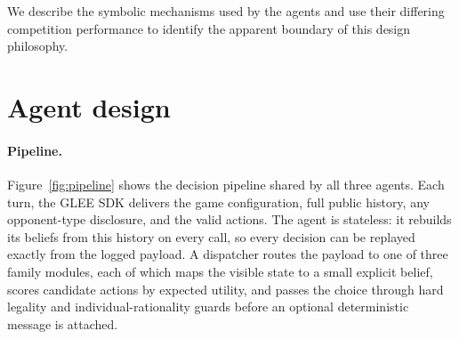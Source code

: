 \documentclass{article}
\begin{document}
We describe the symbolic mechanisms used by the agents and use their differing competition performance to identify the apparent boundary of this design philosophy.


\section{Agent design}

\paragraph{Pipeline.}
Figure~\ref{fig:pipeline} shows the decision pipeline shared by all three agents.
Each turn, the GLEE SDK delivers the game configuration, full public history, any opponent-type disclosure, and the valid actions.
The agent is stateless: it rebuilds its beliefs from this history on every call, so every decision can be replayed exactly from the logged payload.
A dispatcher routes the payload to one of three family modules, each of which maps the visible state to a small explicit belief, scores candidate actions by expected utility, and passes the choice through hard legality and individual-rationality guards before an optional deterministic message is attached.
\end{document}

